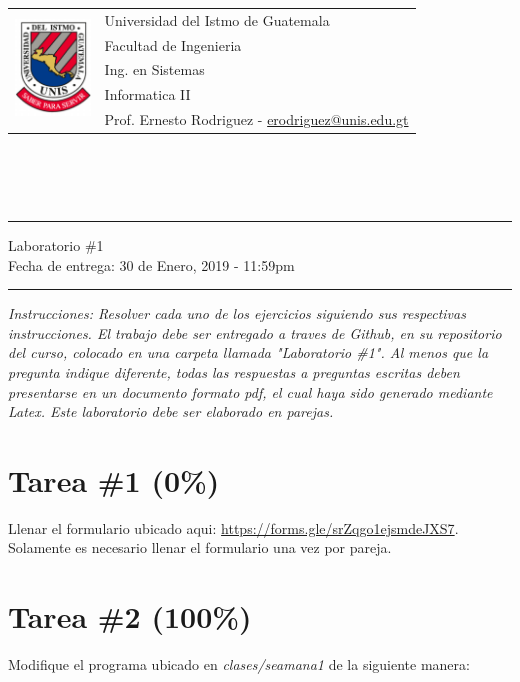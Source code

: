 \documentclass{article}
\newcommand{\horrule}[1]{\rule{\linewidth}{#1}}
\begin{document}
\begin{tabular}{l l}
\multirow{5}{*}{\includegraphics[width=2cm]{../../recursos/logo.png}} & Universidad del Istmo de Guatemala \\
 & Facultad de Ingenieria \\
 & Ing. en Sistemas \\
 & Informatica II \\
 & Prof. Ernesto Rodriguez - \href{mailto:erodriguez@unis.edu.gt}{erodriguez@unis.edu.gt} \\
\end{tabular}
\\\\\\

\begin{center}
        \horrule{0.5pt}
        \huge{Laboratorio \#1} \\
        \large{Fecha de entrega: 30 de Enero, 2019 - 11:59pm} \\
        \horrule{1pt}
\end{center}

\emph{Instrucciones: Resolver cada uno de los ejercicios siguiendo sus respectivas
instrucciones. El trabajo debe ser entregado a traves de Github, en su repositorio del curso, colocado en una carpeta llamada "Laboratorio \#1".
Al menos que la pregunta indique diferente, todas las respuestas a preguntas escritas deben presentarse en
un documento formato pdf, el cual haya sido generado mediante Latex. Este laboratorio
debe ser elaborado en parejas.}

\section*{Tarea \#1 (0\%)}

Llenar el formulario ubicado aqui: \url{https://forms.gle/srZqgo1ejsmdeJXS7}. Solamente
es necesario llenar el formulario una vez por pareja.

\section*{Tarea \#2 (100\%)}

Modifique el programa ubicado en \emph{clases/seamana1} de la siguiente manera:
\end{document}
